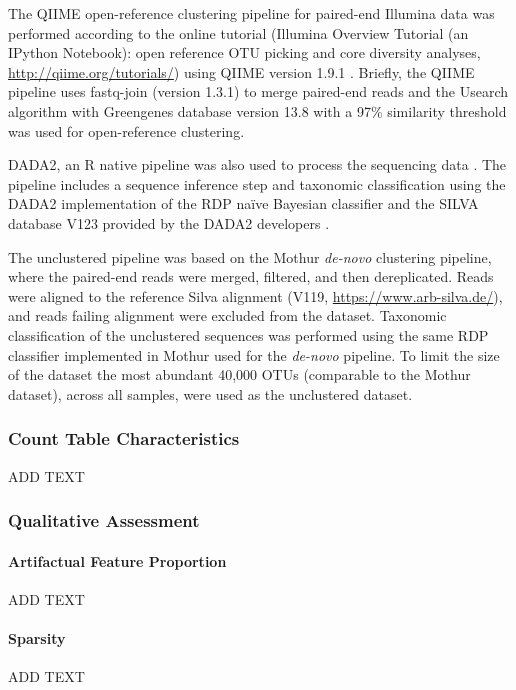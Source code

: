 \documentclass[linenumbers]{bmcart}
\begin{document}
The QIIME open-reference clustering pipeline for paired-end Illumina
data was performed according to the online tutorial (Illumina Overview
Tutorial (an IPython Notebook): open reference OTU picking and core
diversity analyses, \url{http://qiime.org/tutorials/}) using QIIME
version 1.9.1 \cite{Caporaso2010}. Briefly, the QIIME pipeline uses
fastq-join (version 1.3.1) to merge paired-end reads
\cite{aronesty2011ea} and the Usearch algorithm \cite{edgar2010search}
with Greengenes database version 13.8 with a 97\% similarity threshold
\cite{desantis2006greengenes} was used for open-reference clustering.

DADA2, an R native pipeline was also used to process the sequencing data
\cite{callahan2016dada2}. The pipeline includes a sequence inference
step and taxonomic classification using the DADA2 implementation of the
RDP naïve Bayesian classifier \cite{wang2007naive} and the SILVA
database V123 provided by the DADA2 developers
\cite[\url{https://benjjneb.github.io/dada2/training.html}]{quast2012silva}.

The unclustered pipeline was based on the Mothur \emph{de-novo}
clustering pipeline, where the paired-end reads were merged, filtered,
and then dereplicated. Reads were aligned to the reference Silva
alignment (V119, \url{https://www.arb-silva.de/}), and reads failing
alignment were excluded from the dataset. Taxonomic classification of
the unclustered sequences was performed using the same RDP classifier
implemented in Mothur used for the \emph{de-novo} pipeline. To limit the
size of the dataset the most abundant 40,000 OTUs (comparable to the
Mothur dataset), across all samples, were used as the unclustered
dataset.

\subsubsection{Count Table Characteristics}
ADD TEXT

\subsubsection{Qualitative Assessment}
\paragraph{Artifactual Feature Proportion}
ADD TEXT

\paragraph{Sparsity}
ADD TEXT
\end{document}
